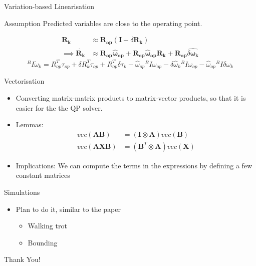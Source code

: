 \documentclass{beamer}
\begin{document}
\begin{frame}{Variation-based Linearisation}
\begin{block}{Assumption}
    Predicted variables are close to the operating point.
\end{block}
\begin{align}
\mathbf{R_k} & \approx \mathbf{R_{op}} (\mathbf{I} + \delta \mathbf{R_k})
\\ \implies
\dot{\mathbf{R_k}} & \approx \mathbf{R_{op}}\mathbf{\hat \omega_{op}} + \mathbf{R_{op}}\mathbf{\hat\omega_{op}}\mathbf{R_k} + \mathbf{R_{op}}\widehat{\delta\mathbf{\omega_k}}
\end{align}
\begin{equation}
    ^B I \dot{\omega}_k = R_{op}^T \tau_{op} + \delta R_k^T \tau_{op} + R_{op}^T \delta \tau_k - \hat{\omega}_{op} {}^B I \omega_{op} - \delta \hat{\omega}_k {}^B I \omega_{op} - \hat{\omega}_{op} {}^B I \delta \omega_k
\end{equation}
\end{frame}

\begin{frame}{Vectorisation}
\begin{itemize}
    \item Converting matrix-matrix products to matrix-vector products, so that it is easier for the the QP solver.
    \item Lemmas:
        \begin{align}
            vec (\mathbf{AB}) & = (\mathbf{I} \otimes \mathbf{A}) vec(\mathbf{B})
            \\ 
            vec (\mathbf{AXB}) & = (\mathbf{B}^T \otimes \mathbf{A}) vec(\mathbf{X})
        \end{align}
    \item Implications:
    We can compute the terms in the expressions by defining a few constant matrices
\end{itemize}
\end{frame}

\begin{frame}{Simulations}
\begin{itemize}
    \item Plan to do it, similar to the paper
    \begin{itemize}
        \item Walking trot
        \item Bounding
    \end{itemize}
\end{itemize}
\end{frame}

\begin{frame}
	\LARGE{Thank You!}
\end{frame}\normalfont
\end{document}
